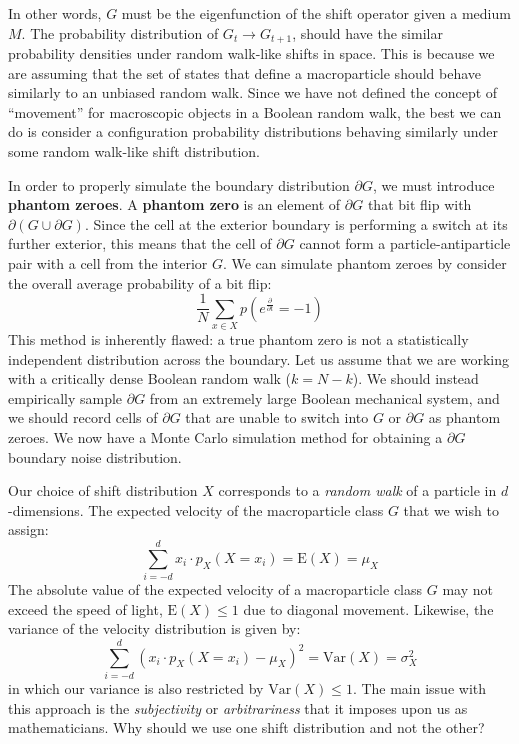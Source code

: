\documentclass[10pt, a5paper, twoside, openright]{memoir}
\begin{document}
In other words, $G$ must be the eigenfunction of the shift operator given a medium $M$. The probability distribution of $G_t \rightarrow G_{t+1}$, should have the similar probability densities under random walk-like shifts in space. This is because we are assuming that the set of states that define a macroparticle should behave similarly to an unbiased random walk. Since we have not defined the concept of ``movement'' for macroscopic objects in a Boolean random walk, the best we can do is consider a configuration probability distributions behaving similarly under some random walk-like shift distribution.

In order to properly simulate the boundary distribution $\partial G$, we must introduce \textbf{phantom zeroes}. A \textbf{phantom zero} is an element of $\partial G$ that bit flip with $\partial (G \cup \partial G)$. Since the cell at the exterior boundary is performing a switch at its further exterior, this means that the cell of $\partial G$ cannot form a particle-antiparticle pair with a cell from the interior $G$. We can simulate phantom zeroes by consider the overall average probability of a bit flip:
$$\frac{1}{N} \sum\limits_{x \in X} p(e^{\frac{\partial}{\partial t}} = -1)$$
This method is inherently flawed: a true phantom zero is not a statistically independent distribution across the boundary. Let us assume that we are working with a critically dense Boolean random walk ($k = N-k$). We should instead empirically sample $\partial G$ from an extremely large Boolean mechanical system, and we should record cells of $\partial G$ that are unable to switch into $G$ or $\partial G$ as phantom zeroes. We now have a Monte Carlo simulation method for obtaining a $\partial G$ boundary noise distribution.

Our choice of shift distribution $X$ corresponds to a \textit{random walk} of a particle in $d$-dimensions. The expected velocity of the macroparticle class $G$ that we wish to assign:
$$\sum\limits_{i=-d}^d x_i \cdot p_X (X = x_i) = \mathrm{E}(X) = \mu_X$$
The absolute value of the expected velocity of a macroparticle class $G$ may not exceed the speed of light, $\mathrm{E}(X) \leq 1$ due to diagonal movement. Likewise, the variance of the velocity distribution is given by:
$$\sum\limits_{i=-d}^d (x_i \cdot p_X (X = x_i)- \mu_X)^2 = \mathrm{Var}(X) = \sigma_X^2$$
in which our variance is also restricted by $\mathrm{Var}(X) \leq 1$. The main issue with this approach is the \textit{subjectivity} or \textit{arbitrariness} that it imposes upon us as mathematicians. Why should we use one shift distribution and not the other?
\end{document}
